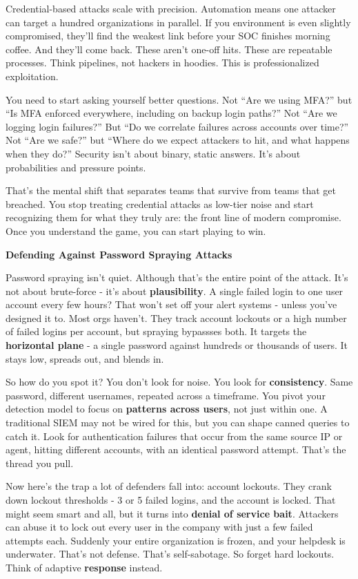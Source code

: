 Credential-based attacks scale with precision. Automation means one attacker can target a hundred organizations in parallel. If you environment is even slightly compromised, they’ll find the weakest link before your SOC finishes morning coffee. And they’ll come back. These aren’t one-off hits. These are repeatable processes. Think pipelines, not hackers in hoodies. This is professionalized exploitation.

You need to start asking yourself better questions. Not “Are we using MFA?” but “Is MFA enforced everywhere, including on backup login paths?” Not “Are we logging login failures?” But “Do we correlate failures across accounts over time?” Not “Are we safe?” but “Where do we expect attackers to hit, and what happens when they do?” Security isn’t about binary, static answers. It’s about probabilities and pressure points.

That’s the mental shift that separates teams that survive from teams that get breached. You stop treating credential attacks as low-tier noise and start recognizing them for what they truly are: the front line of modern compromise. Once you understand the game, you can start playing to win.

\textbf{Defending Against Password Spraying Attacks}

Password spraying isn’t quiet. Although that’s the entire point of the attack. It’s not about brute-force - it’s about \textbf{plausibility}. A single failed login to one user account every few hours? That won’t set off your alert systems - unless you’ve designed it to. Most orgs haven’t. They track account lockouts or a high number of failed logins per account, but spraying bypassses both. It targets the \textbf{horizontal plane} - a single password against hundreds or thousands of users. It stays low, spreads out, and blends in.

So how do you spot it? You don’t look for noise. You look for \textbf{consistency}. Same password, different usernames, repeated across a timeframe. You pivot your detection model to focus on \textbf{patterns across users}, not just within one. A traditional SIEM may not be wired for this, but you can shape canned queries to catch it. Look for authentication failures that occur from the same source IP or agent, hitting different accounts, with an identical password attempt. That’s the thread you pull.

Now here’s the trap a lot of defenders fall into: account lockouts. They crank down lockout thresholds - 3 or 5 failed logins, and the account is locked. That might seem smart and all, but it turns into \textbf{denial of service bait}. Attackers can abuse it to lock out every user in the company with just a few failed attempts each. Suddenly your entire organization is frozen, and your helpdesk is underwater. That’s not defense. That’s self-sabotage. So forget hard lockouts. Think of adaptive\textbf{ response} instead.

